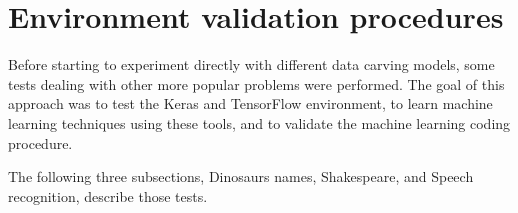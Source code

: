 \section{Environment validation procedures}
Before starting to experiment directly with different data carving models,
some tests dealing with other more popular problems were performed.
The goal of this approach was to test the Keras and TensorFlow environment, to learn machine learning techniques using these tools, and to validate the machine learning coding procedure.

The following three subsections, Dinosaurs names, Shakespeare, and Speech recognition, describe those tests.



